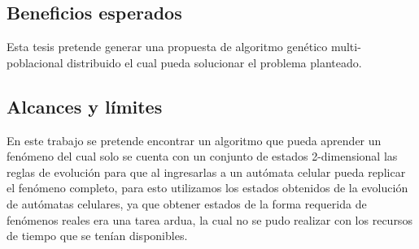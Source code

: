 \subsection{Beneficios esperados}
Esta tesis pretende generar una propuesta de algoritmo genético multi-poblacional distribuido el cual pueda solucionar el problema planteado.

\subsection{Alcances y límites}
En este trabajo se pretende encontrar un algoritmo que pueda aprender un fenómeno del cual solo se cuenta con un conjunto de estados 2-dimensional las reglas de evolución para que al ingresarlas a un autómata celular pueda replicar el fenómeno completo, para esto utilizamos los estados obtenidos de la evolución de autómatas celulares, ya que obtener estados de la forma requerida de fenómenos reales era una tarea ardua, la cual no se pudo realizar con los recursos de tiempo que se tenían disponibles.


